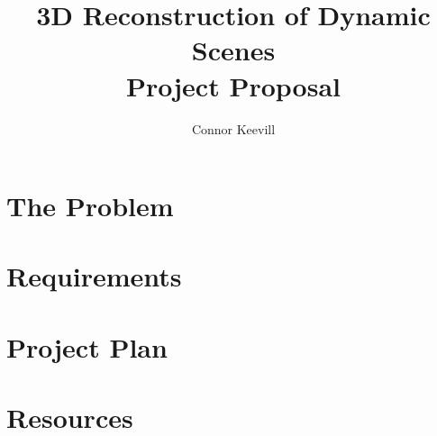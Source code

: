\documentclass[11pt]{article}
\title{
	{3D Reconstruction of Dynamic Scenes} \\[1ex]
	\large Project Proposal
}
\author{Connor Keevill}
\begin{document}
	\maketitle

	\pagebreak
	\tableofcontents
	\pagebreak

	\twocolumn

	\section[Problem]{The Problem}\label{sec:the-problem}
	

	\section{Requirements}\label{sec:requirements}
	

	\section{Project Plan}\label{sec:project-plan}
	

	\section{Resources}\label{sec:resources}
	

	
	
	
\end{document}
